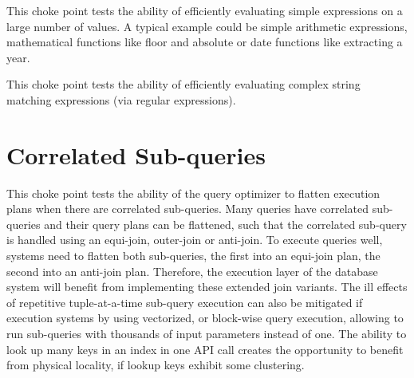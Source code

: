 

This choke point tests the ability of efficiently evaluating simple expressions on a large number of values. A typical example could be simple arithmetic expressions, mathematical functions like floor and absolute or date functions like extracting a year.





This choke point tests the ability of efficiently evaluating complex string
matching expressions (\eg via regular expressions).

%


\section{Correlated Sub-queries}



This choke point tests the ability of the query optimizer to flatten execution plans when there are correlated sub-queries. Many queries have correlated sub-queries and their query plans can be flattened,
such that the correlated sub-query is handled using an equi-join, outer-join or anti-join. To execute queries well, systems need to flatten both sub-queries, the first into an equi-join plan, the second into an anti-join plan.
Therefore, the execution layer of the database system will benefit from implementing these extended join variants.
The ill effects of repetitive tuple-at-a-time sub-query execution can also be mitigated if execution systems by using vectorized, or block-wise query execution, allowing to run sub-queries with thousands of input parameters instead of one.
The ability to look up many keys in an index in one API call creates the opportunity to benefit from physical locality, if lookup keys exhibit some clustering.

